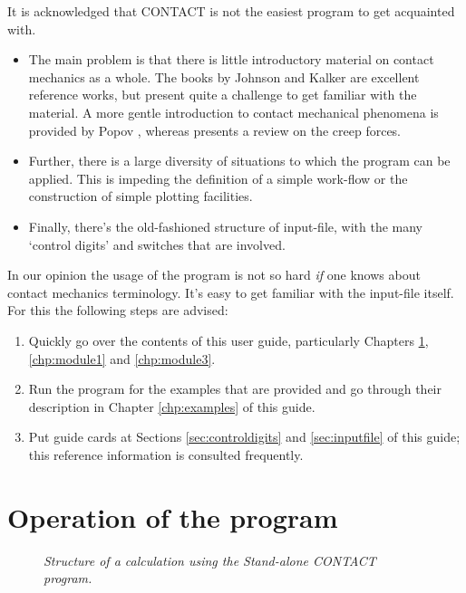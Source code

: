\documentclass[12pt]{report}
\begin{document}
It is acknowledged that CONTACT is not the easiest program to get acquainted
with.
\begin{itemize}
\item The main problem is that there is little introductory material on
contact mechanics as a whole. The books by Johnson \cite{Johnson1985} and
Kalker \cite{Kalker1990} are excellent reference works, but present quite a
challenge to get familiar with the material. A more gentle introduction to
contact mechanical phenomena is provided by Popov \cite{Popov2010a-book},
whereas \cite{Vollebregt2021a-soa-paper} presents a review on the
creep forces. 
\item Further, there is a large diversity of situations to which the program
can be applied. This is impeding the definition of a simple work-flow or
the construction of simple plotting facilities.
\item Finally, there's the old-fashioned structure of input-file, with the
many `control digits' and switches that are involved.
\end{itemize}
In our opinion the usage of the program is not so hard {\em if\/} one knows
about contact mechanics terminology. It's easy to get familiar with the
input-file itself. For this the following steps are advised:
\begin{enumerate}
\item Quickly go over the contents of this user guide, particularly
Chapters \ref{chp:operation}, \ref{chp:module1} and \ref{chp:module3}.
\item Run the program for the examples that are provided and go through
their description in Chapter \ref{chp:examples} of this guide.
\item Put guide cards at Sections \ref{sec:controldigits} and
\ref{sec:inputfile} of this guide; this reference information is consulted
frequently.
\end{enumerate}


\chapter{Operation of the program}
\label{chp:operation}

\begin{figure}[p]
\centering
{}
\caption{\em Structure of a calculation using the Stand-alone CONTACT program.}
\label{fig:arch_exe}
\end{figure}
\end{document}
